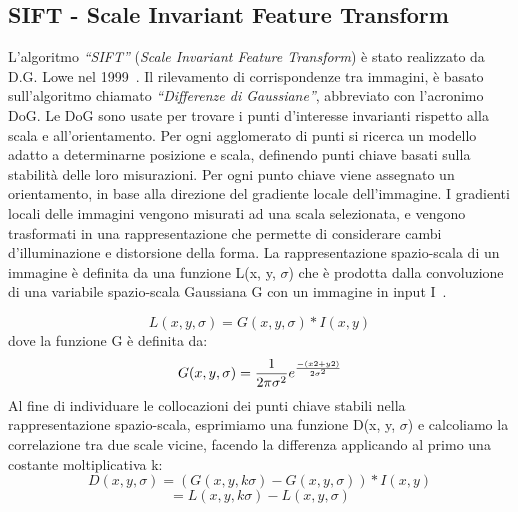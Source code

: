 \subsection{SIFT - Scale Invariant Feature Transform}
L'algoritmo \textit{``SIFT''} (\textit{Scale Invariant Feature Transform}) è stato realizzato da D.G. Lowe nel 1999~\cite{Lowe2004}. Il rilevamento di corrispondenze tra immagini, è basato sull'algoritmo chiamato \textit{``Differenze di Gaussiane''}, abbreviato con l'acronimo DoG. Le DoG sono usate per trovare i punti d'interesse invarianti rispetto alla scala e all'orientamento. Per ogni agglomerato di punti si ricerca un modello adatto a determinarne posizione e scala, definendo punti chiave basati sulla stabilità delle loro misurazioni. Per ogni punto chiave viene assegnato un orientamento, in base alla direzione del gradiente locale dell'immagine. I gradienti locali delle immagini vengono misurati ad una scala selezionata, e vengono trasformati in una rappresentazione che permette di considerare cambi d'illuminazione e distorsione della forma.\hfill \break
\noindent La rappresentazione spazio-scala di un immagine è definita da una funzione L(x, y, \(\sigma\)) che è prodotta dalla convoluzione di una variabile spazio-scala Gaussiana G con un immagine in input I~\cite{Lowe2004}. \par
\begin{equation}
	L(x, y, \sigma) = G(x, y, \sigma) * I(x, y)
\end{equation}
\noindent dove la funzione G è definita da:
\begin{equation}
    G(x, y, \sigma) = \frac{1}{2\pi\sigma^2}e^\frac{-(x2+y2)}{2\sigma^2}
\end{equation}
\noindent
Al fine di individuare le collocazioni dei punti chiave stabili nella rappresentazione spazio-scala, esprimiamo una funzione D(x, y, \(\sigma\)) e calcoliamo la correlazione tra due scale vicine, facendo la differenza applicando al primo una costante moltiplicativa k:
\begin{equation}
	D(x, y, \sigma) = (G(x, y, k\sigma) - G(x, y, \sigma)) * I(x, y)
\end{equation}
\begin{equation}
    = L(x, y, k\sigma) - L(x, y, \sigma)
\end{equation}
